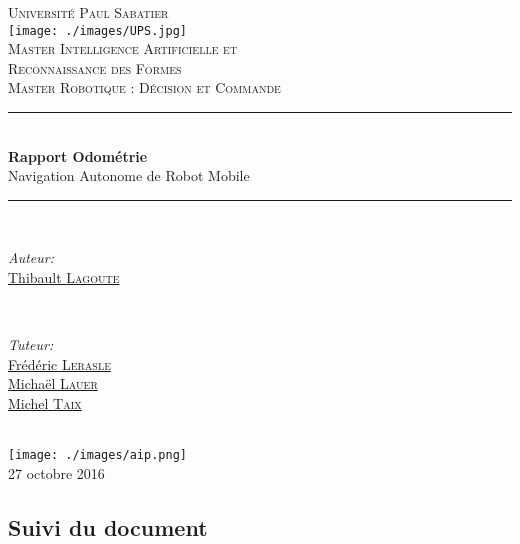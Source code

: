\documentclass[10pt,a4paper]{article}
\begin{document}
\pagestyle {plain}

\begin{titlepage}


\newcommand{\HRule}{\rule{\linewidth}{0.5mm}} 

\center

\textsc{\Large Université Paul Sabatier}\\[1cm] 
\texttt{[image: ./images/UPS.jpg]}\\[0.6cm] 


\textsc{Master Intelligence Artificielle et \\ 
Reconnaissance des Formes \\ Master Robotique : Décision et Commande}\\[3cm] 

\HRule \\[0.4cm]
{ \huge \bfseries Rapport Odométrie}\\[0.4cm] 
\LARGE Navigation Autonome de Robot Mobile

\HRule \\[3.5cm]
 

\begin{minipage}{0.4\textwidth}
\begin{flushleft} \large
\emph{Auteur:}\\
\href{mailto:lagoute.31@gmail.com}{Thibault \textsc{Lagoute} }  
\end{flushleft}
\end{minipage}
~
\begin{minipage}{0.4\textwidth}
\begin{flushright} \large
\emph{Tuteur:} \\
\href{mailto:lerasle@laas.fr}{Frédéric \textsc{Lerasle}}\\
\href{mailto:michael.lauer@laas.fr}{Michaël \textsc{Lauer}} \\
\href{mailto:taix@laas.f}{Michel \textsc{Taix}}
\end{flushright}
\end{minipage}\\[1cm]

\texttt{[image: ./images/aip.png]} \\[1.1cm] 

\large 27 octobre 2016
 

\end{titlepage}

\subsection*{Suivi du document}
\end{document}
